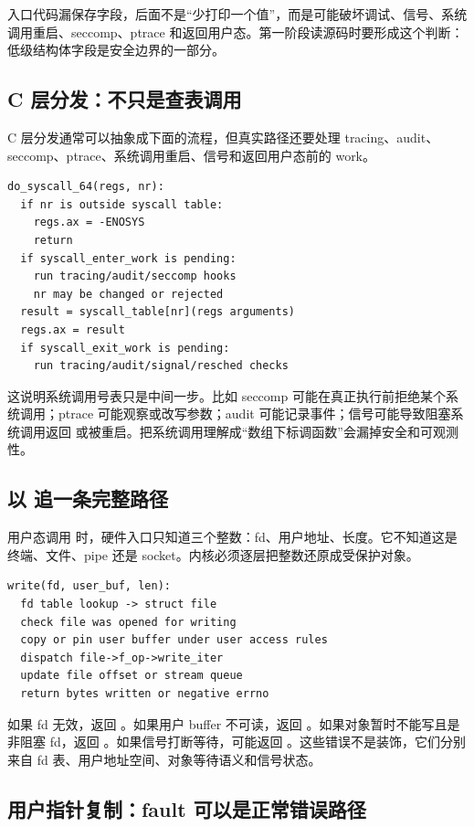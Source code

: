 入口代码漏保存字段，后面不是“少打印一个值”，而是可能破坏调试、信号、系统调用重启、seccomp、ptrace 和返回用户态。第一阶段读源码时要形成这个判断：低级结构体字段是安全边界的一部分。

\subsection{C 层分发：不只是查表调用}

C 层分发通常可以抽象成下面的流程，但真实路径还要处理 tracing、audit、seccomp、ptrace、系统调用重启、信号和返回用户态前的 work。

\begin{lstlisting}
do_syscall_64(regs, nr):
  if nr is outside syscall table:
    regs.ax = -ENOSYS
    return
  if syscall_enter_work is pending:
    run tracing/audit/seccomp hooks
    nr may be changed or rejected
  result = syscall_table[nr](regs arguments)
  regs.ax = result
  if syscall_exit_work is pending:
    run tracing/audit/signal/resched checks
\end{lstlisting}

这说明系统调用号表只是中间一步。比如 seccomp 可能在真正执行前拒绝某个系统调用；ptrace 可能观察或改写参数；audit 可能记录事件；信号可能导致阻塞系统调用返回  或被重启。把系统调用理解成“数组下标调函数”会漏掉安全和可观测性。

\subsection{以  追一条完整路径}

用户态调用  时，硬件入口只知道三个整数：fd、用户地址、长度。它不知道这是终端、文件、pipe 还是 socket。内核必须逐层把整数还原成受保护对象。

\begin{lstlisting}
write(fd, user_buf, len):
  fd table lookup -> struct file
  check file was opened for writing
  copy or pin user buffer under user access rules
  dispatch file->f_op->write_iter
  update file offset or stream queue
  return bytes written or negative errno
\end{lstlisting}

如果 fd 无效，返回 。如果用户 buffer 不可读，返回 。如果对象暂时不能写且是非阻塞 fd，返回 。如果信号打断等待，可能返回 。这些错误不是装饰，它们分别来自 fd 表、用户地址空间、对象等待语义和信号状态。

\subsection{用户指针复制：fault 可以是正常错误路径}

